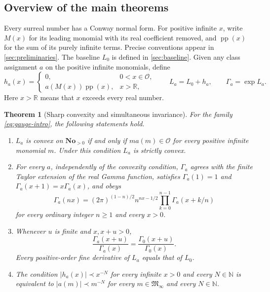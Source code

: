 \documentclass[11pt,letterpaper]{article}
\numberwithin{equation}{section}
\newtheorem{theorem}{Theorem}[section]
\theoremstyle{plain}
\theoremstyle{definition}
\theoremstyle{remark}
\newcommand{\No}{\mathbf{No}}
\newcommand{\R}{\mathbb R}
\newcommand{\N}{\mathbb N}
\newcommand{\Ocal}{\mathcal O}
\newcommand{\Minf}{\mathfrak M_{\infty}}
\newcommand{\pp}{\operatorname{pp}}
\newcommand{\abs}[1]{\lvert#1\rvert}
\begin{document}
\subsection{Overview of the main theorems}
Every surreal number has a Conway normal form. For positive infinite $x$,
write $M(x)$ for its leading monomial with its real coefficient removed, and
$\pp(x)$ for the sum of its purely infinite terms. Precise conventions appear
in \cref{sec:preliminaries}. The baseline $L_0$ is defined in
\cref{sec:baseline}. Given any class assignment $a$ on the positive infinite
monomials, define
\begin{equation}\label{eq:gauge-intro}
 h_a(x)=
 \begin{cases}
 0,&0<x\in\Ocal,\\
 a(M(x))\pp(x),&x>\R,
 \end{cases}
 \qquad L_a=L_0+h_a,\qquad \Gamma_a=\exp L_a.
\end{equation}
Here $x>\R$ means that $x$ exceeds every real number.

\begin{theorem}[Sharp convexity and simultaneous invariance]\label{thm:main}
For the family \eqref{eq:gauge-intro}, the following statements hold.
\begin{enumerate}[label=(\roman*)]
\item $L_a$ is convex on $\No_{>0}$ if and only if
$m a(m)\in\Ocal$ for every positive infinite monomial $m$. Under this
condition $L_a$ is strictly convex.
\item For every $a$, independently of the convexity condition,
$\Gamma_a$ agrees with the finite Taylor extension of the real Gamma function,
satisfies $\Gamma_a(1)=1$ and $\Gamma_a(x+1)=x\Gamma_a(x)$, and obeys
\begin{equation}\label{eq:gauss-intro}
 \Gamma_a(nx)=(2\pi)^{(1-n)/2}n^{nx-1/2}
 \prod_{k=0}^{n-1}\Gamma_a(x+k/n)
\end{equation}
for every ordinary integer $n\ge1$ and every $x>0$.
\item Whenever $u$ is finite and $x,x+u>0$,
\begin{equation}\label{eq:ratio-intro}
 \frac{\Gamma_a(x+u)}{\Gamma_a(x)}
 =\frac{\Gamma_0(x+u)}{\Gamma_0(x)}.
\end{equation}
Every positive-order fine derivative of $L_a$ equals that of $L_0$.
\item The condition
$\abs{h_a(x)}\prec x^{-N}$ for every infinite $x>0$ and every
$N\in\N$ is equivalent to
$\abs{a(m)}\prec m^{-N}$ for every $m\in\Minf$ and every $N\in\N$.
\end{enumerate}
\end{theorem}
\end{document}
